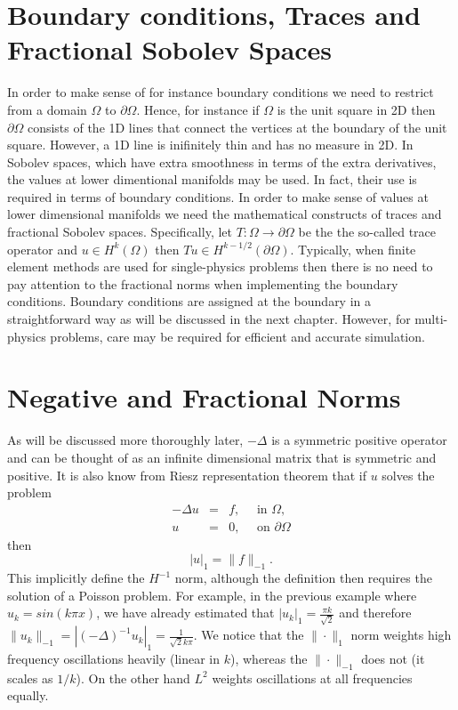 \section{Boundary conditions, Traces and Fractional Sobolev Spaces }

In order to make sense of for instance boundary conditions we need to 
restrict from a domain $\Omega$ to $\partial \Omega$. Hence, for instance
if $\Omega$ is the unit square in 2D then $\partial \Omega$ consists of the 1D lines that 
connect the vertices at the boundary of the unit square. However, a 
1D line is inifinitely thin and has no measure in 2D. In Sobolev spaces, which
have extra smoothness in terms of the extra derivatives, the   
values at lower dimentional manifolds may be used. In fact, their use is required 
in terms of boundary conditions. In order to make sense of values at lower 
dimensional manifolds we need the mathematical constructs of traces and fractional 
Sobolev spaces. Specifically, let $T:\Omega \rightarrow \partial \Omega$ be the 
the so-called trace operator and $u \in H^k(\Omega)$ then 
$Tu \in H^{k-1/2} (\partial \Omega)$. Typically, when finite element methods
are used for single-physics problems then there is no need to pay attention to 
the fractional norms when implementing the boundary conditions. Boundary conditions
are assigned at the boundary in a straightforward way as will be discussed in the next
chapter. However, for multi-physics problems, care may be required for efficient and
accurate simulation.   

\section{Negative and Fractional Norms}

As will be discussed more thoroughly later, 
$-\Delta$ is a symmetric positive operator and can be thought of 
as an infinite dimensional matrix that is symmetric and positive.  
It is also know from Riesz representation theorem that if
$u$ solves the problem
\begin{eqnarray*}
-\Delta u &=& f, \quad \mbox{ in } \Omega, \\   
        u &=& 0, \quad \mbox{ on } \partial \Omega  
\end{eqnarray*}
then 
\begin{equation}
\label{riesz}
|u|_1 = \|f\|_{-1} . 
\end{equation}
This implicitly define the $H^{-1}$ norm, although
the definition then requires the solution of a Poisson problem.   
For example, in the previous example where
$u_k = sin(k\pi x)$, we  have already estimated  
that $|u_k|_1 = \frac{\pi k}{\sqrt{2}}$ and therefore 
$\|u_k\|_{-1} = |(-\Delta)^{-1} u_k|_1 = \frac{1}{\sqrt{2} k \pi }$.  
We notice that the $\|\cdot\|_1$ norm weights high frequency oscillations heavily (linear in $k$), whereas
the $\|\cdot\|_{-1}$ does not (it scales as $1/k$). On the other hand $L^2$ weights oscillations at all frequencies
equally.   \label{sinkpnorms} 

